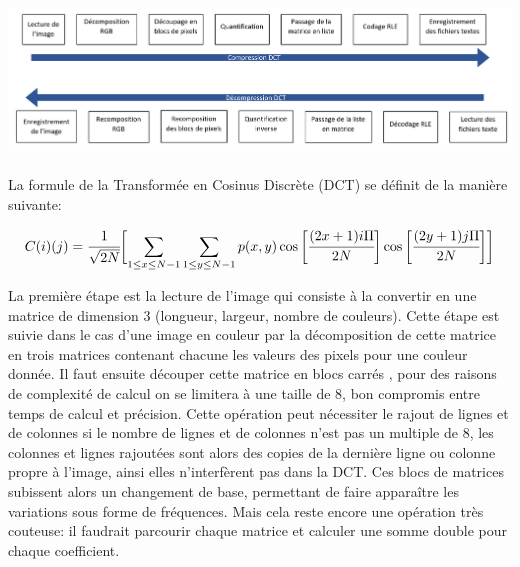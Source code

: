 \documentclass[12pt]{article}
\begin{document}
\paragraph{}
\begin{center}
\includegraphics[scale=0.2]{schema_dct_new.png} %
\end{center}
\paragraph{}
La formule de la Transformée en Cosinus Discrète (DCT) se définit de la manière suivante: 

\begin{equation*} 
C(i)(j)=\cfrac{1}{\sqrt{2N}} \biggl[\sum_{1\leq x\leq N-1} \sum_{1\leq y\leq N-1} p(x,y) \cos{\biggl[\cfrac{(2x+1) i \Pi}{2N}}\biggr] \cos{\biggl[\cfrac{(2y+1) j \Pi}{2N}}\biggr]\biggr]
\end{equation*}

La première étape est la lecture de l’image qui consiste à la convertir en une matrice de dimension 3 (longueur, largeur, nombre de couleurs). Cette étape est suivie dans le cas d’une image en couleur par la décomposition de cette matrice en trois matrices contenant chacune les valeurs des pixels pour une couleur donnée. Il faut ensuite découper cette matrice en blocs carrés , pour des raisons de complexité de calcul on se limitera à une taille de 8, bon compromis entre temps de calcul et précision. Cette opération peut nécessiter le rajout de lignes et de colonnes si le nombre de lignes et de colonnes n’est pas un multiple de 8, les colonnes et lignes rajoutées sont alors des copies de la dernière ligne ou colonne propre à l’image, ainsi elles n’interfèrent pas dans la DCT. Ces blocs de matrices subissent alors un changement de base, permettant de faire apparaître les variations sous forme de fréquences. Mais cela reste encore une opération très couteuse: il faudrait parcourir chaque matrice et calculer une somme double pour chaque coefficient.
\paragraph{}
\end{document}
